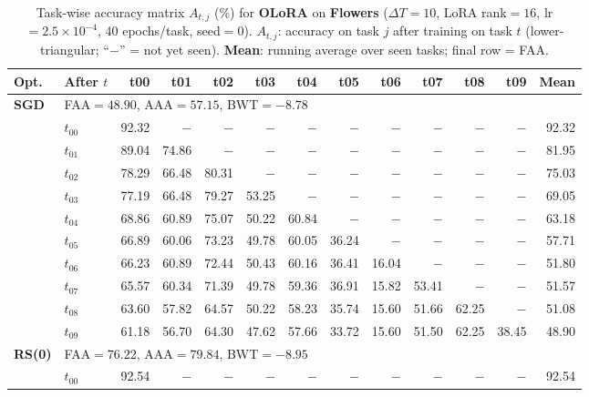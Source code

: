 \begin{table}[ht]
\centering
\caption{%
  Task-wise accuracy matrix $A_{t,j}$ (\%) for \textbf{OLoRA} on \textbf{Flowers} ($\Delta T=10$, LoRA rank$=16$, lr$=2.5\times10^{-4}$, 40 epochs/task, seed$=0$).
  $A_{t,j}$: accuracy on task $j$ after training on task $t$  (lower-triangular; ``$-$'' = not yet seen).
  \textbf{Mean}: running average over seen tasks; final row = FAA.
}
\label{tab:raw_olora_flowers}
\setlength{\tabcolsep}{2.8pt}
\renewcommand{\arraystretch}{0.88}
\scriptsize
\begin{tabular}{@{}l l r r r r r r r r r r r@{}}
\toprule
\textbf{Opt.} & \textbf{After $t$} & \textbf{t00} & \textbf{t01} & \textbf{t02} & \textbf{t03} & \textbf{t04} & \textbf{t05} & \textbf{t06} & \textbf{t07} & \textbf{t08} & \textbf{t09} & \textbf{Mean} \\
\midrule
\multirow{11}{*}{\textbf{SGD}} & \multicolumn{12}{l}{\quad\small FAA$=48.90$,\; AAA$=57.15$,\; BWT$=-8.78$} \\
 & $t_{00}$ & 92.32 & $-$ & $-$ & $-$ & $-$ & $-$ & $-$ & $-$ & $-$ & $-$ & 92.32 \\
 & $t_{01}$ & 89.04 & 74.86 & $-$ & $-$ & $-$ & $-$ & $-$ & $-$ & $-$ & $-$ & 81.95 \\
 & $t_{02}$ & 78.29 & 66.48 & 80.31 & $-$ & $-$ & $-$ & $-$ & $-$ & $-$ & $-$ & 75.03 \\
 & $t_{03}$ & 77.19 & 66.48 & 79.27 & 53.25 & $-$ & $-$ & $-$ & $-$ & $-$ & $-$ & 69.05 \\
 & $t_{04}$ & 68.86 & 60.89 & 75.07 & 50.22 & 60.84 & $-$ & $-$ & $-$ & $-$ & $-$ & 63.18 \\
 & $t_{05}$ & 66.89 & 60.06 & 73.23 & 49.78 & 60.05 & 36.24 & $-$ & $-$ & $-$ & $-$ & 57.71 \\
 & $t_{06}$ & 66.23 & 60.89 & 72.44 & 50.43 & 60.16 & 36.41 & 16.04 & $-$ & $-$ & $-$ & 51.80 \\
 & $t_{07}$ & 65.57 & 60.34 & 71.39 & 49.78 & 59.36 & 36.91 & 15.82 & 53.41 & $-$ & $-$ & 51.57 \\
 & $t_{08}$ & 63.60 & 57.82 & 64.57 & 50.22 & 58.23 & 35.74 & 15.60 & 51.66 & 62.25 & $-$ & 51.08 \\
 & $t_{09}$ & 61.18 & 56.70 & 64.30 & 47.62 & 57.66 & 33.72 & 15.60 & 51.50 & 62.25 & 38.45 & 48.90 \\
\midrule
\multirow{11}{*}{\textbf{RS(0)}} & \multicolumn{12}{l}{\quad\small FAA$=76.22$,\; AAA$=79.84$,\; BWT$=-8.95$} \\
 & $t_{00}$ & 92.54 & $-$ & $-$ & $-$ & $-$ & $-$ & $-$ & $-$ & $-$ & $-$ & 92.54 \\

\end{tabular}
\end{table}
